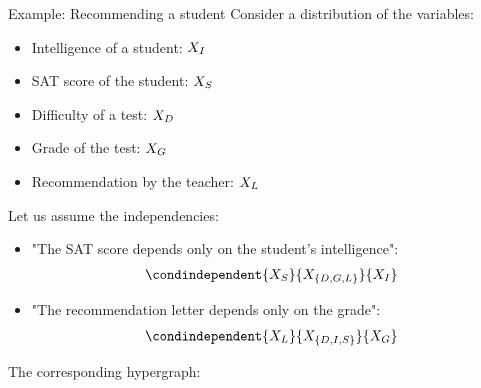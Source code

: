 \documentclass{beamer}
\begin{document}
    \begin{frame}{Example: Recommending a student}
        Consider a distribution of the variables:
        \begin{itemize}
            \item Intelligence of a student: $X_{I}$
            \item SAT score of the student: $X_{S}$
            \item Difficulty of a test: $X_{D}$
            \item Grade of the test: $X_{G}$
            \item Recommendation by the teacher: $X_{L}$
        \end{itemize}
        \begin{minipage}{0.5\linewidth}
            Let us assume the independencies:
            \begin{itemize}
                \item "The SAT score depends only on the student's intelligence":
                \begin{align*}
                    \condindependent{\catvariableof{S}}{\catvariableof{\{D,G,L\}}}{\catvariableof{I}}
                \end{align*}
                \item "The recommendation letter depends only on the grade":
                \begin{align*}
                    \condindependent{\catvariableof{L}}{\catvariableof{\{D,I,S\}}}{\catvariableof{G}}
                \end{align*}
            \end{itemize}
        \end{minipage}
        \begin{minipage}{0.45\linewidth}
            The corresponding hypergraph:
            \begin{center}
                
            \end{center}
        \end{minipage}
    \end{frame}
\end{document}
